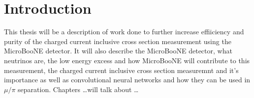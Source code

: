 \chapter{Introduction}
This thesis will be a description of work done to further increase effiiciency and purity of the charged current inclusive cross section measurement using the MicroBooNE detector. It will also describe the MicroBooNE detector, what neutrinos are, the low energy excess and how MicroBooNE will contribute to this measurement, the charged current inclusive cross section measuremnt and it's importance as well as convolutional neural networks and how they can be used in $\mu/\pi$ separation. Chapters \dots will talk about \dots
